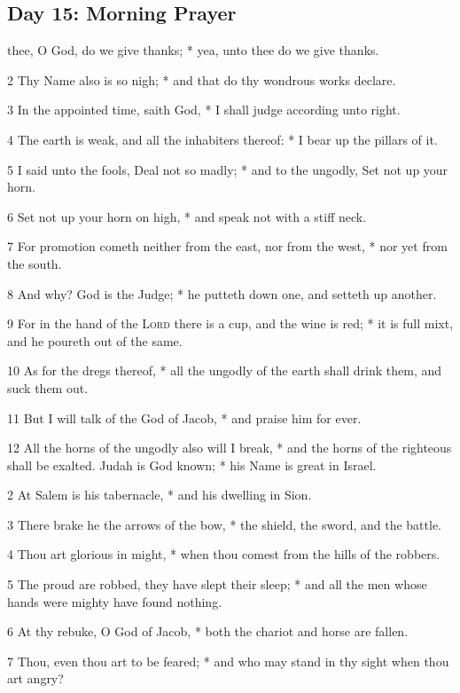 \subsection{Day 15: Morning Prayer}
 thee, O God, do we give thanks; * yea, unto thee do we give thanks.\par
2 Thy Name also is so nigh; * and that do thy wondrous works declare.\par
3 In the appointed time, saith God, * I shall judge according unto right.\par
4 The earth is weak, and all the inhabiters thereof: * I bear up the pillars of it.\par
5 I said unto the fools, Deal not so madly; * and to the ungodly, Set not up your horn.\par
6 Set not up your horn on high, * and speak not with a stiff neck.\par
7 For promotion cometh neither from the east, nor from the west, * nor yet from the south.\par
8 And why? God is the Judge; * he putteth down one, and setteth up another.\par
9 For in the hand of the {\textsc{Lord}} there is a cup, and the wine is red; * it is full mixt, and he poureth out of the same.\par
10 As for the dregs thereof, * all the ungodly of the earth shall drink them, and suck them out.\par
11 But I will talk of the God of Jacob, * and praise him for ever.\par
12 All the horns of the ungodly also will I break, * and the horns of the righteous shall be exalted.
 Judah is God known; * his Name is great in Israel.\par
2 At Salem is his tabernacle, * and his dwelling in Sion.\par
3 There brake he the arrows of the bow, * the shield, the sword, and the battle.\par
4 Thou art glorious in might, * when thou comest from the hills of the robbers.\par
5 The proud are robbed, they have slept their sleep; * and all the men whose hands were mighty have found nothing.\par
6 At thy rebuke, O God of Jacob, * both the chariot and horse are fallen.\par
7 Thou, even thou art to be feared; * and who may stand in thy sight when thou art angry?\par

